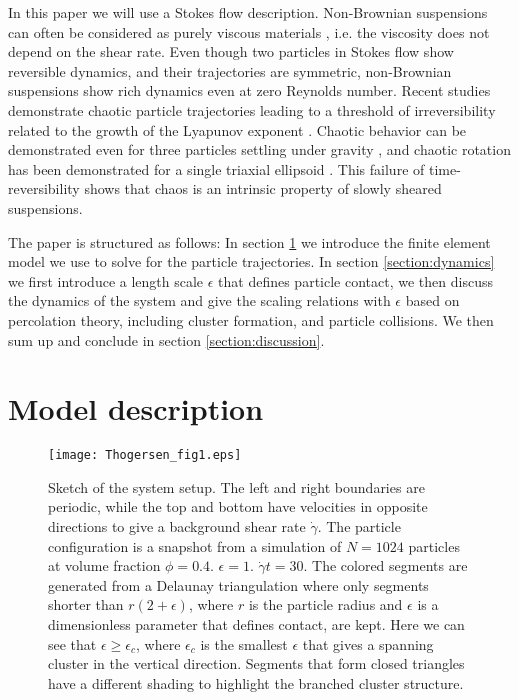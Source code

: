 \documentclass[aps,pre,twocolumn,letterpaper,floatfix,showpacs]{revtex4}
\begin{document}
In this paper we will use a Stokes flow description. Non-Brownian suspensions can often be considered as purely viscous materials \cite{ovarlez2006local}, i.e. the viscosity does not depend on the shear rate. Even though two particles in Stokes flow show reversible dynamics, and their trajectories are symmetric, non-Brownian suspensions show rich dynamics even at zero Reynolds number. Recent studies demonstrate chaotic particle trajectories leading to a threshold of irreversibility related to the growth of the Lyapunov exponent \cite{pine2005chaos}. Chaotic behavior can be demonstrated even for three particles settling under gravity \cite{janosi1997chaotic}, and chaotic rotation has been demonstrated for a single triaxial ellipsoid \cite{yarin1997chaotic}. This failure of time-reversibility shows that chaos is an intrinsic property of slowly sheared suspensions. 

The paper is structured as follows: In section \ref{section:model_description} we introduce the finite element model we use to solve for the particle trajectories. In section \ref{section:dynamics} we first introduce a length scale $\epsilon$ that defines particle contact, we then discuss the dynamics of the system and give the scaling relations with $\epsilon$ based on percolation theory, including cluster formation, and particle collisions. We then sum up and conclude in section \ref {section:discussion}.

\section{Model description} \label{section:model_description} 
\begin{figure}
\texttt{[image: Thogersen\_fig1.eps]}
\caption{Sketch of the system setup. The left and right boundaries are periodic, while the top and bottom have velocities in opposite directions to give a background shear rate $\dot \gamma$. The particle configuration is a snapshot from a simulation of $N=1024$ particles at volume fraction $\phi = 0.4$. $\epsilon = 1$. $\dot \gamma t = 30$. The colored segments are generated from a Delaunay triangulation where only segments shorter than $r(2+\epsilon)$, where $r$ is the particle radius and $\epsilon$ is a dimensionless parameter that defines contact, are kept. Here we can see that $\epsilon \geq \epsilon_c$, where $\epsilon_c$ is the smallest $\epsilon$ that gives a spanning cluster in the vertical direction. Segments that form closed triangles have a different shading to highlight the branched cluster structure.
\label{fig:bc_sketch}}
\end{figure}
\end{document}
